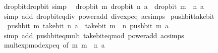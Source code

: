 \begin{isabellebody}
\endisatagproof
{\isafoldproof}%
%
\isadelimproof
\isanewline
%
\endisadelimproof
\isanewline
{}\isamarkupfalse%
\ drop{\isacharunderscore}{\kern0pt}bit{\isacharunderscore}{\kern0pt}drop{\isacharunderscore}{\kern0pt}bit\ {\isacharbrackleft}{\kern0pt}simp{\isacharbrackright}{\kern0pt}{\isacharcolon}{\kern0pt}\isanewline
\ \ {\isachardoublequoteopen}drop{\isacharunderscore}{\kern0pt}bit\ m\ {\isacharparenleft}{\kern0pt}drop{\isacharunderscore}{\kern0pt}bit\ n\ a{\isacharparenright}{\kern0pt}\ {\isacharequal}{\kern0pt}\ drop{\isacharunderscore}{\kern0pt}bit\ {\isacharparenleft}{\kern0pt}m\ {\isacharplus}{\kern0pt}\ n{\isacharparenright}{\kern0pt}\ a{\isachardoublequoteclose}\isanewline
%
\isadelimproof
\ \ %
\endisadelimproof
%
\isatagproof
{}\isamarkupfalse%
\ {\isacharparenleft}{\kern0pt}simp\ add{\isacharcolon}{\kern0pt}\ drop{\isacharunderscore}{\kern0pt}bit{\isacharunderscore}{\kern0pt}eq{\isacharunderscore}{\kern0pt}div\ power{\isacharunderscore}{\kern0pt}add\ div{\isacharunderscore}{\kern0pt}exp{\isacharunderscore}{\kern0pt}eq\ ac{\isacharunderscore}{\kern0pt}simps{\isacharparenright}{\kern0pt}%
\endisatagproof
{\isafoldproof}%
%
\isadelimproof
\isanewline
%
\endisadelimproof
\isanewline
{}\isamarkupfalse%
\ push{\isacharunderscore}{\kern0pt}bit{\isacharunderscore}{\kern0pt}take{\isacharunderscore}{\kern0pt}bit{\isacharcolon}{\kern0pt}\isanewline
\ \ {\isachardoublequoteopen}push{\isacharunderscore}{\kern0pt}bit\ m\ {\isacharparenleft}{\kern0pt}take{\isacharunderscore}{\kern0pt}bit\ n\ a{\isacharparenright}{\kern0pt}\ {\isacharequal}{\kern0pt}\ take{\isacharunderscore}{\kern0pt}bit\ {\isacharparenleft}{\kern0pt}m\ {\isacharplus}{\kern0pt}\ n{\isacharparenright}{\kern0pt}\ {\isacharparenleft}{\kern0pt}push{\isacharunderscore}{\kern0pt}bit\ m\ a{\isacharparenright}{\kern0pt}{\isachardoublequoteclose}\isanewline
%
\isadelimproof
\ \ %
\endisadelimproof
%
\isatagproof
{}\isamarkupfalse%
\ {\isacharparenleft}{\kern0pt}simp\ add{\isacharcolon}{\kern0pt}\ push{\isacharunderscore}{\kern0pt}bit{\isacharunderscore}{\kern0pt}eq{\isacharunderscore}{\kern0pt}mult\ take{\isacharunderscore}{\kern0pt}bit{\isacharunderscore}{\kern0pt}eq{\isacharunderscore}{\kern0pt}mod\ power{\isacharunderscore}{\kern0pt}add\ ac{\isacharunderscore}{\kern0pt}simps{\isacharparenright}{\kern0pt}\isanewline
\ \ \isamarkupfalse%
\ mult{\isacharunderscore}{\kern0pt}exp{\isacharunderscore}{\kern0pt}mod{\isacharunderscore}{\kern0pt}exp{\isacharunderscore}{\kern0pt}eq\ {\isacharbrackleft}{\kern0pt}of\ m\ {\isacartoucheopen}m\ {\isacharplus}{\kern0pt}\ n{\isacartoucheclose}\ a{\isacharbrackright}{\kern0pt}\ \isamarkupfalse%

\end{isabellebody}
